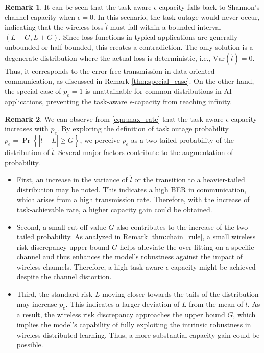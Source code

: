 \documentclass[lettersize,journal]{IEEEtran}
\theoremstyle{definition}
\newtheorem{remark}{Remark}
\theoremstyle{plain}
\begin{document}
\begin{remark}
    It can be seen that the task-aware $\epsilon$-capacity falls back to Shannon's channel capacity when $\epsilon = 0$. 
    In this scenario, the task outage would never occur, indicating that the wireless loss $\hat{l}$ must fall within a bounded interval $(L-G,L+G)$. 
    Since loss functions in typical applications are generally unbounded or half-bounded, this creates a contradiction. The only solution is a degenerate distribution where the actual loss is deterministic, i.e., $\text{Var}(\hat{l}) = 0$. Thus, it corresponds to the error-free transmission in data-oriented communication, as discussed in Remark \ref{thm:special_case}.
    On the other hand, the special case of $p_e=1$ is unattainable for common distributions in AI applications, preventing the task-aware $\epsilon$-capacity from reaching infinity. 
\end{remark}
\begin{remark}
    We can observe from \cref{equ:max_rate} that the task-aware $\epsilon$-capacity increases with $p_e$.
    By exploring the definition of task outage probability $p_e=\Pr\left\{\left|\hat{l}-L\right|\geq G\right\}$, we perceive $p_e$ as a two-tailed probability of the distribution of $\hat{l}$. Several major factors contribute to the augmentation of probability. 
    \begin{itemize}
        \item First, an increase in the variance of $\hat{l}$ or the transition to a heavier-tailed distribution may be noted. This indicates a high BER in communication, which arises from a high transmission rate. Therefore, with the increase of task-achievable rate, a higher capacity gain could be obtained.
        \item Second, a small cut-off value $G$ also contributes to the increase of the two-tailed probability. 
        As analyzed in Remark \ref{thm:chain_rule}, a small wireless risk discrepancy upper bound $G$ helps alleviate the over-fitting on a specific channel and thus enhances the model's robustness against the impact of wireless channels. 
        Therefore, a high task-aware $\epsilon$-capacity might be achieved despite the channel distortion. 
        \item Third, the standard risk $L$ moving closer towards the tails of the distribution may increase $p_e$. This indicates a larger deviation of $L$ from the mean of $\hat{l}$. As a result, the wireless risk discrepancy approaches the upper bound $G$, which implies the model's capability of fully exploiting the intrinsic robustness in wireless distributed learning. Thus, a more substantial capacity gain could be possible.
    \end{itemize}
\end{remark}
\end{document}
